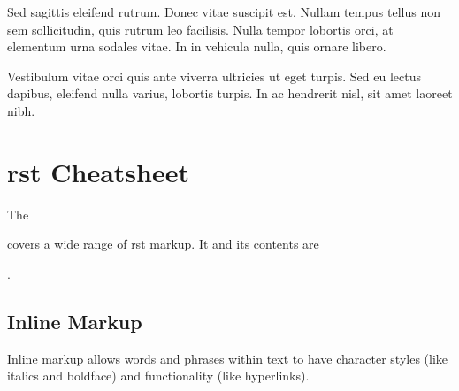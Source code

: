 \documentclass[letterpaper,10pt,english]{sphinxmanual}
\begin{document}
Sed sagittis eleifend rutrum. Donec vitae suscipit est. Nullam tempus tellus
non sem sollicitudin, quis rutrum leo facilisis. Nulla tempor lobortis orci,
at elementum urna sodales vitae. In in vehicula nulla, quis ornare libero.



Vestibulum vitae orci quis ante viverra ultricies ut eget turpis. Sed eu
lectus dapibus, eleifend nulla varius, lobortis turpis. In ac hendrerit nisl,
sit amet laoreet nibh.




\chapter{rst Cheatsheet}
\label{\detokenize{rst-cheatsheet/rst-cheatsheet:rst-cheatsheet}}\label{\detokenize{rst-cheatsheet/rst-cheatsheet::doc}}
The %
\begin{footnote}[12]\sphinxAtStartFootnote
{}
%
\end{footnote} covers a wide range of
rst markup. It and its contents are
%
\begin{footnote}[13]\sphinxAtStartFootnote
{}
%
\end{footnote}.


\section{Inline Markup}
\label{\detokenize{rst-cheatsheet/rst-cheatsheet:inline-markup}}
Inline markup allows words and phrases within text to have character styles (like italics and boldface) and functionality (like hyperlinks).
\end{document}
